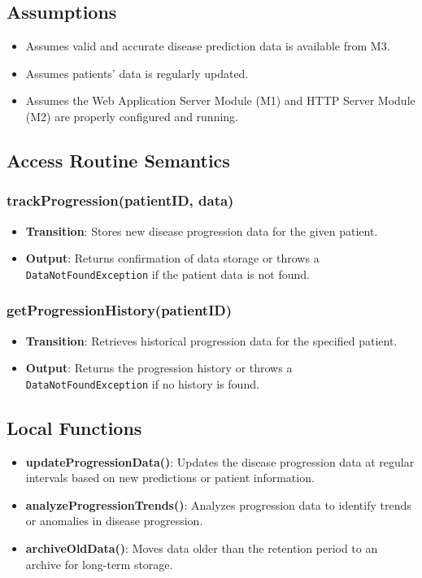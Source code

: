 \documentclass[12pt, titlepage]{article}
\begin{document}
\subsection{Assumptions}
\begin{itemize}
\item Assumes valid and accurate disease prediction data is available from M3.
\item Assumes patients' data is regularly updated.
\item Assumes the Web Application Server Module (M1) and HTTP Server Module (M2) are properly configured and running.
\end{itemize}

\subsection{Access Routine Semantics}
\subsubsection{trackProgression(patientID, data)}

\begin{itemize}
    \item \textbf{Transition}: Stores new disease progression data for the given patient.
    \item \textbf{Output}: Returns confirmation of data storage or throws a \texttt{DataNotFoundException} if the patient data is not found.
\end{itemize}

\subsubsection{getProgressionHistory(patientID)}

\begin{itemize}
    \item \textbf{Transition}: Retrieves historical progression data for the specified patient.
    \item \textbf{Output}: Returns the progression history or throws a \texttt{DataNotFoundException} if no history is found.
\end{itemize}


\subsection{Local Functions}
\begin{itemize}
\item \textbf{updateProgressionData()}: Updates the disease progression data at regular intervals based on new predictions or patient information.
\item \textbf{analyzeProgressionTrends()}: Analyzes progression data to identify trends or anomalies in disease progression.
\item \textbf{archiveOldData()}: Moves data older than the retention period to an archive for long-term storage.
\end{itemize}
\end{document}
